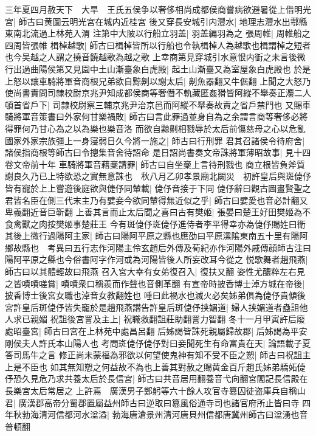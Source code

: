 三年夏四月赦天下　大旱　王氏五侯争以奢侈相尚成都侯商嘗病欲避暑從上借明光宮|{
	師古曰黄圖云明光宮在城内近桂宮}
後又穿長安城引内灃水|{
	地理志灃水出鄠縣東南北流過上林苑入渭}
注第中大陂以行船立羽盖|{
	羽盖編羽為之}
張周帷|{
	周帷船之四周皆張帷}
楫棹越歌|{
	師古曰楫棹皆所以行船也令執楫棹人為越歌也楫謂棹之短者也今吴越之人謂之撓音饒越歌為越之歌}
上幸商第見穿城引水意恨内衘之未言後微行出過曲陽侯第又見園中土山漸臺象白虎殿|{
	起土山漸臺又為室屋象白虎殿也}
於是上怒以讓車騎將軍音商根兄弟欲自黥劓以謝太后|{
	劓魚器翻又牛倨翻}
上聞之大怒乃使尚書責問司隸校尉京兆尹知成都侯商等奢僭不軌藏匿姦猾皆阿縱不舉奏正灋二人頓首省戶下|{
	司隸校尉察三輔京兆尹治京邑而阿縱不舉奏故責之省戶禁門也}
又賜車騎將軍音策書曰外家何甘樂禍敗|{
	師古曰言此罪過並身自為之余謂言商等奢侈必將得罪何乃甘心為之以為樂也樂音洛}
而欲自黥劓相戮辱於太后前傷慈母之心以危亂國家外家宗族彊上一身寖弱日久今將一施之|{
	師古曰行刑罪}
君其召諸侯令待府舍|{
	諸侯指商根等師古曰令摠集音舍待詔命}
是日詔尚書奏文帝誅將軍薄昭故事|{
	見十四卷文帝前十年}
車騎將軍音藉稾請罪|{
	師古曰自坐稾上言待刑戮也}
商立根皆負斧質謝良久乃已上特欲恐之實無意誅也　秋八月乙卯孝景廟北闕災　初許皇后與斑偼伃皆有寵於上上嘗遊後庭欲與倢伃同輦載|{
	偼伃音接于下同}
偼伃辭曰觀古圖畫賢聖之君皆名臣在側三代末主乃有嬖妾今欲同輦得無近似之乎|{
	師古曰嬖愛也音必計翻又卑義翻近音巨靳翻}
上善其言而止太后聞之喜曰古有樊姬|{
	張晏曰楚王好田樊姬為不食禽獸之肉按樊姬事楚莊王}
今有斑偼伃斑偼伃進侍者李平得幸亦為偼伃賜姓曰衛其後上微行過陽阿主家|{
	師古曰陽阿平原之縣也應劭曰平原漯隂東南五十里有陽阿鄉故縣也　考異曰五行志作河陽主伶玄趙后外傳及荀紀亦作河陽外戚傳顔師古注曰陽阿平原之縣也今俗書阿字作河或為河陽皆後人所妄改耳今從之}
悦歌舞者趙飛燕|{
	師古曰以其體輕故曰飛燕}
召入宮大幸有女弟復召入|{
	復扶又翻}
姿性尤醲粹左右見之皆嘖嘖嗟賞|{
	嘖嘖衆口稱羨而作聲也音側革翻}
有宣帝時披香博士淖方城在帝後|{
	披香博士後宮女職也淖音女教翻姓也}
唾曰此禍水也滅火必矣姊弟俱為偼伃貴傾後宮許皇后斑偼伃皆失寵於是趙飛燕譛告許皇后斑偼伃挟媚道|{
	婦人挟媚道者蠱詛他人求已親媚}
祝詛後宮詈及主上|{
	祝職救翻詛莊助翻詈力智翻}
冬十一月甲寅許后廢處昭臺宮|{
	師古曰宮在上林苑中處昌呂翻}
后姊謁皆誅死親屬歸故郡|{
	后姊謁為平安剛侯夫人許氏本山陽人也}
考問斑偼伃偼伃對曰妾聞死生有命富貴在天|{
	論語載子夏答司馬牛之言}
修正尚未蒙福為邪欲以何望使鬼神有知不受不臣之愬|{
	師古曰祝詛主上是不臣也}
如其無知愬之何益故不為也上善其對赦之賜黄金百斤趙氏姊弟驕妬偼伃恐久見危乃求共養太后於長信宮|{
	師古曰共音居用翻養音弋向翻宮閣記長信殿在長樂宮太后常居之}
上許焉　廣漢男子鄭躬等六十餘人攻官寺簒囚徒盗庫兵自稱山君|{
	廣漢郡高帝分蜀郡置屬益州師古曰逆取曰簒風俗通寺司也諸官府所止皆曰寺}
四年秋勃海清河信都河水湓溢|{
	勃海唐滄景州清河唐貝州信都唐冀州師古曰湓湧也音普頓翻}
